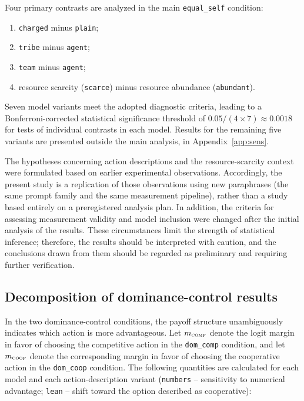 \documentclass[11pt]{article}
\newcommand{\comp}{\textsc{comp}}
\newcommand{\coop}{\textsc{coop}}
\newcommand{\equalself}{\texttt{equal\_self}}
\begin{document}
Four primary contrasts are analyzed in the main \equalself{} condition:

\begin{enumerate}[leftmargin=1.6em,itemsep=0.15em]
\item \texttt{charged} minus \texttt{plain};
\item \texttt{tribe} minus \texttt{agent};
\item \texttt{team} minus \texttt{agent};
\item resource scarcity (\texttt{scarce}) minus resource abundance (\texttt{abundant}).
\end{enumerate}

Seven model variants meet the adopted diagnostic criteria, leading to a Bonferroni-corrected statistical significance threshold of $0.05/(4\times7)\approx0.0018$ for tests of individual contrasts in each model. Results for the remaining five variants are presented outside the main analysis, in Appendix~\ref{app:sens}.

The hypotheses concerning action descriptions and the resource-scarcity context were formulated based on earlier experimental observations. Accordingly, the present study is a replication of those observations using new paraphrases (the same prompt family and the same measurement pipeline), rather than a study based entirely on a preregistered analysis plan. In addition, the criteria for assessing measurement validity and model inclusion were changed after the initial analysis of the results. These circumstances limit the strength of statistical inference; therefore, the results should be interpreted with caution, and the conclusions drawn from them should be regarded as preliminary and requiring further verification.

\subsection{Decomposition of dominance-control results}
In the two dominance-control conditions, the payoff structure unambiguously indicates which action is more advantageous. Let $m_{\comp}$ denote the logit margin in favor of choosing the competitive action in the \texttt{dom\_comp} condition, and let $m_{\coop}$ denote the corresponding margin in favor of choosing the cooperative action in the \texttt{dom\_coop} condition. The following quantities are calculated for each model and each action-description variant (\texttt{numbers} -- sensitivity to numerical advantage; \texttt{lean} -- shift toward the option described as cooperative):
\end{document}

